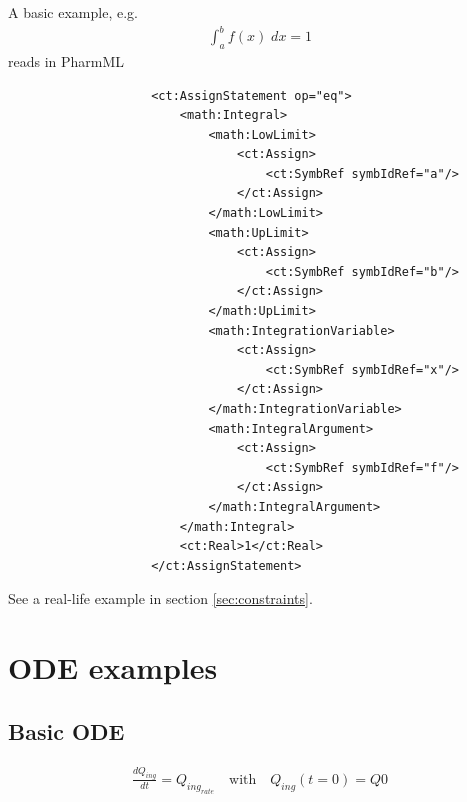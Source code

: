 A basic example, e.g.
\begin{align}
\int_{a}^{b} f(x) \; dx = 1 \nonumber 
\end{align}
reads in PharmML
\lstset{language=XML}
\begin{lstlisting}
                    <ct:AssignStatement op="eq">
                        <math:Integral>
                            <math:LowLimit>
                                <ct:Assign>
                                    <ct:SymbRef symbIdRef="a"/>
                                </ct:Assign>
                            </math:LowLimit>
                            <math:UpLimit>
                                <ct:Assign>
                                    <ct:SymbRef symbIdRef="b"/>
                                </ct:Assign>
                            </math:UpLimit>
                            <math:IntegrationVariable>
                                <ct:Assign>
                                    <ct:SymbRef symbIdRef="x"/>
                                </ct:Assign>
                            </math:IntegrationVariable>
                            <math:IntegralArgument>
                                <ct:Assign>
                                    <ct:SymbRef symbIdRef="f"/>
                                </ct:Assign>
                            </math:IntegralArgument>
                        </math:Integral>
                        <ct:Real>1</ct:Real>
                    </ct:AssignStatement>
\end{lstlisting}

See a real-life example in section \ref{sec:constraints}.

\section{ODE examples}
\label{sec:ODEexamples}

\subsection{Basic ODE}
\label{sec:basic ODE}

\begin{align}
\frac{dQ_{ing}}{dt}  = Q_{{ing}_{rate}} \quad \text{with} \quad Q_{ing}(t\!=\!0)\!=\!Q0 \nonumber
\end{align}


